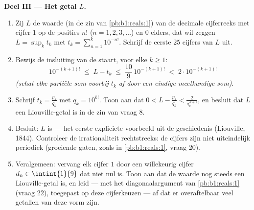 \begin{problem}
\medskip
\noindent\textbf{Deel III --- Het getal $L$.}
\begin{enumerate}[resume]
  \item Zij $L$ de waarde (in de zin van \cref{pb:b1:reals:1}) van
        de decimale cijferreeks met cijfer $1$ op de posities $n!$
        ($n = 1, 2, 3, \dots$) en $0$ elders, dat wil zeggen $L =
        \sup_k t_k$ met $t_k = \sum_{n=1}^{k} 10^{-n!}$. Schrijf
        de eerste $25$ cijfers van $L$ uit.
  \item Bewijs de insluiting van de staart, voor elke $k \geq 1$:
        \[
        10^{-(k+1)!} \;\leq\; L - t_k \;\leq\;
        \frac{10}{9}\,10^{-(k+1)!} \;<\; 2\cdot 10^{-(k+1)!}
        \]
        \emph{(schat elke partiële som voorbij $t_k$ af door een
        eindige meetkundige som)}.
  \item Schrijf $t_k = \frac{p_k}{q_k}$ met $q_k = 10^{k!}$. Toon
        aan dat $0 < L - \frac{p_k}{q_k} < \frac{2}{q_k^{\,k+1}}$,
        en besluit dat $L$ een Liouville-getal is in de zin van
        vraag 8.
  \item Besluit: $L$ is  --- het eerste expliciete
        voorbeeld uit de geschiedenis (Liouville, 1844). Controleer
        de irrationaliteit rechtstreeks: de cijfers zijn niet
        uiteindelijk periodiek (groeiende gaten, zoals in
        \cref{pb:b1:reals:1}, vraag 20).
  \item Veralgemeen: vervang elk cijfer $1$ door een willekeurig
        cijfer $d_n \in \intint{1}{9}$ dat niet nul is. Toon aan
        dat de waarde nog steeds een Liouville-getal is, en leid
        --- met het diagonaalargument van \cref{pb:b1:reals:1}
        (vraag 22), toegepast op deze cijferkeuzen --- af dat er
        overaftelbaar veel  getallen van deze vorm
        zijn.
\end{enumerate}


\end{problem}

